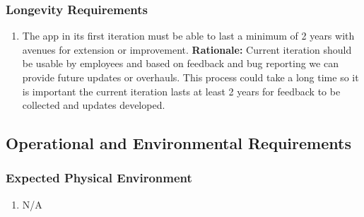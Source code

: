 \documentclass[]{article}
\begin{document}
\subsubsection{Longevity Requirements}
\label{ssub:longevity_requirements}
\begin{enumerate}[{PR-L}1. ]
	\item The app in its first iteration must be able to last a minimum of 2 years with avenues for extension or improvement. \newline
	      \textbf{Rationale:} Current iteration should be usable by employees and based on feedback and bug reporting we can provide future updates or overhauls. This process could take a long time so it is important the current iteration lasts at least 2 years for feedback to be collected and updates developed.

\end{enumerate}


\subsection{Operational and Environmental Requirements}
\label{sub:operational_and_environmental_requirements}

\subsubsection{Expected Physical Environment}
\label{ssub:expected_physical_environment}
\begin{enumerate}[{OE-EPE}1. ]
	\item N/A
\end{enumerate}
\end{document}
